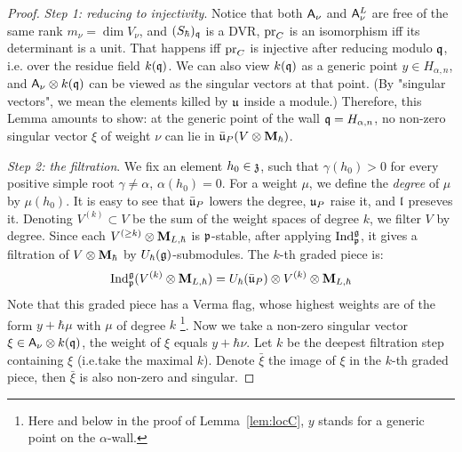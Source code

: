 \documentclass{article}
\theoremstyle{plain}
\theoremstyle{definition}
\theoremstyle{remark}
\numberwithin{equation}{section}
\begin{document}
\begin{proof}
\emph{Step 1: reducing to injectivity}. Notice that both $\mathsf A_\nu$ and $\mathsf A_\nu^L$ are free of the same rank $m_\nu = \dim V_\nu$, and $(S_\hbar)_\mathfrak q$ is a DVR, $\operatorname{pr}_C$ is an isomorphism iff its determinant is a unit. That happens iff $\operatorname{pr}_C$ is injective after reducing modulo $\mathfrak q$, i.e. over the residue field $k(\mathfrak q)$. We can also view $k(\mathfrak q)$ as a generic point $y \in H_{\alpha,n}$, and $\mathsf A_{\nu}\otimes k(\mathfrak q)$ can be viewed as the singular vectors at that point. (By "singular vectors", we mean the elements killed by $\mathfrak{u}$ inside a module.) Therefore, this Lemma amounts to show: at the generic point of the wall $\mathfrak q = H_{\alpha,n}$, no non-zero singular vector $\xi$ of weight $\nu$ can lie in $\bar{\mathfrak{u}}_P (V\otimes \mathbf{M}_{\hbar})$.    

\emph{Step 2: the filtration}. We fix an element $h_0 \in \mathfrak{z}$, such that $\gamma (h_0) >0$ for every positive simple root $\gamma \neq \alpha$, $\alpha (h_0)=0$. For a weight $\mu$, we define the \emph{degree} of $\mu$ by $\mu(h_0)$. It is easy to see that $\bar{\mathfrak{u}}_P$ lowers the degree, $\mathfrak{u}_P$ raise it, and $\mathfrak{l}$ preseves it. Denoting $V^{(k)} \subset V$ be the sum of the weight spaces of degree $k$, we filter $V$ by degree. Since each $V^{(\geq k)} \otimes \mathbf{M}_{L,\hbar}$ is $\mathfrak{p}$-stable, after applying $\operatorname{Ind}_{\mathfrak{p}}^{\mathfrak{g}}$, it gives a filtration of $V\otimes \mathbf{M}_\hbar$ by $U_\hbar(\mathfrak{g})$-submodules. The $k$-th graded piece is:
\begin{equation*}
    \operatorname{Ind}_{\mathfrak{p}}^{\mathfrak{g}} (V^{(k)} \otimes \mathbf{M}_{L,\hbar}) = U_\hbar(\bar{\mathfrak{u}}_P)\otimes V^{(k)}\otimes \mathbf{M}_{L,\hbar}
\end{equation*}
Note that this graded piece has a Verma flag, whose highest weights are of the form $y+\hbar \mu$ with $\mu$ of degree $k$ \footnote{Here and below in the proof of Lemma~\ref{lem:locC}, $y$ stands for a generic point on the $\alpha$-wall.}. Now we take a non-zero singular vector $\xi \in \mathsf A_\nu \otimes k(\mathfrak q)$, the weight of $\xi$ equals $y+\hbar \nu$. Let $k$ be the deepest filtration step containing $\xi$ (i.e.take the maximal $k$). Denote $\bar\xi$ the image of $\xi$ in the $k$-th graded piece, then $\bar\xi$ is also non-zero and singular. 


\end{proof}
\end{document}
